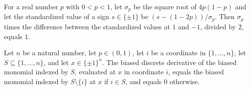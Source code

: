 \begin{theorem}
\label{FABL.biasSigma_mul_standardizedSign_difference_div_two}
\leanok
{}
For a real number $p$ with $0<p<1$, let $\sigma_p$ be the square root of $4p(1-p)$ and
let the standardized value of a sign $s\in\{\pm1\}$ be $(s-(1-2p))/\sigma_p$. Then
$\sigma_p$ times the difference between the standardized values at $1$ and $-1$, divided
by $2$, equals $1$.
\end{theorem}

\begin{theorem}
\label{FABL.biasedDiscreteDerivative_biasedMonomial}
\leanok
{}
Let $n$ be a natural number, let $p\in(0,1)$, let $i$ be a coordinate in
$\{1,\ldots,n\}$, let $S\subseteq\{1,\ldots,n\}$, and let $x\in\{\pm1\}^n$. The biased
discrete derivative of the biased monomial indexed by $S$, evaluated at $x$ in
coordinate $i$, equals the biased monomial indexed by $S\setminus\{i\}$ at $x$ if $i\in
S$, and equals $0$ otherwise.
\end{theorem}

